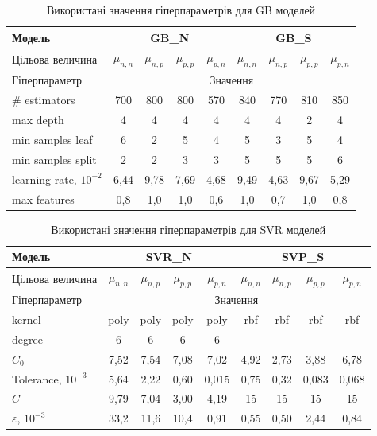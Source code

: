 \documentclass[12pt,a4paper,titlepage,oneside]{book}
\numberwithin{equation}{part}
\begin{document}
\begin{table}[!ht]
\setlength{\tabcolsep}{3pt}
\caption{Використані значення гіперпараметрів для GB моделей}
\label{tblGBrez}
\centering
\begin{tabular}{|l|c|c|c|c|c|c|c|c|}
\hline
Модель& \multicolumn{4}{c|}{GB\_N}& \multicolumn{4}{c|}{GB\_S} \rule{0pt}{11pt}\\
\hline
Цільова величина&$\mu_{n,n}$&$\mu_{n,p}$&$\mu_{p,p}$&$\mu_{p,n}$&$\mu_{n,n}$&$\mu_{n,p}$&$\mu_{p,p}$&$\mu_{p,n}$\\
\hline
Гіперпараметр&\multicolumn{8}{c|}{Значення}\\
\hline
\# estimators&700&800&800&570&840&770&810&850\\
\hline
max depth&4&4&4&4&4&4&2&4\\
\hline
min samples leaf &6&2&5&4&5&3&5&4\\
\hline
min samples split	&2&2&3&3&5&5&5&6\\
\hline
learning rate, $10^{-2}$	&6,44&9,78&7,69&4,68&9,49&4,63&9,67&5,29\\
\hline
max features &0,8&1,0&1,0&0,6&1,0&0,7&1,0&0,8\\
\hline
\end{tabular}
\end{table}

\begin{table}[!ht]
\setlength{\tabcolsep}{3pt}
\caption{Використані значення гіперпараметрів для SVR моделей}
\label{tblSVRrez}
\centering
\begin{tabular}{|l|c|c|c|c|c|c|c|c|}
\hline
Модель& \multicolumn{4}{c|}{SVR\_N}& \multicolumn{4}{c|}{SVP\_S} \rule{0pt}{11pt}\\
\hline
Цільова величина&$\mu_{n,n}$&$\mu_{n,p}$&$\mu_{p,p}$&$\mu_{p,n}$&$\mu_{n,n}$&$\mu_{n,p}$&$\mu_{p,p}$&$\mu_{p,n}$\\
\hline
Гіперпараметр&\multicolumn{8}{c|}{Значення}\\
\hline
kernel &poly&poly&poly&poly&rbf&rbf&rbf&rbf\\
\hline
degree&6&6&6&6&--&--&--&--\\
\hline
$C_0$ &7,52&7,54&7,08&7,02&4,92&2,73&3,88&6,78\\
\hline
Tolerance, $10^{-3}$&5,64&2,22&0,60&0,015&0,75&0,32&0,083&0,068\\
\hline
$C$	&9,79&7,04&3,00&4,19&15&15&15&15\\
\hline
$\varepsilon$, $10^{-3}$ &33,2&11,6&10,4&0,91&0,55&0,50&2,44&0,84\\
\hline
\end{tabular}
\end{table}
\end{document}
